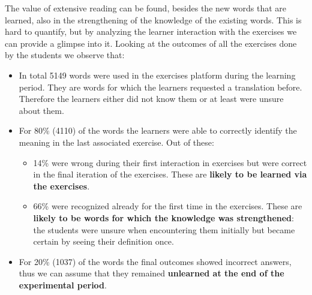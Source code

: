 \begin{added}

  The value of extensive reading can be found, besides the new words that are learned, also in the strengthening of the knowledge of the existing words. This is hard to quantify, but by analyzing the learner interaction with the exercises we can provide a glimpse into it. Looking at the outcomes of all the exercises done by the students we observe that:

  \begin{itemize}
    \item In total 5149 words were used in the exercises platform during the learning period. They are words for which the learners requested a translation before. Therefore the learners either did not know them or at least were unsure about them.

    \item For 80\% (4110) of the words the learners were able to correctly identify the meaning in the last associated exercise. Out of these: 

    \begin{itemize}
      \item 14\% were wrong during their first interaction in exercises but were correct in the final iteration of the exercises. These are {\bf likely to be learned via the exercises}.

      \item 66\% were recognized already for the first time in the exercises. These are {\bf likely to be words for which the knowledge was strengthened}: the students were unsure when encountering them initially but became certain by seeing their definition once. 
    \end{itemize}

    \item For 20\% (1037) of the words the final outcomes showed incorrect answers, thus we can assume that they remained {\bf unlearned at the end of the experimental period}.

  \end{itemize}

\end{added}









